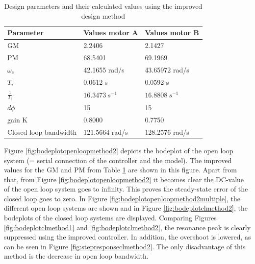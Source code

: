 \documentclass[a4paper,kul]{kulakarticle} %
\begin{document}
\begin{table}[htp!]
	
	\centering
	
	\begin{tabular}{|l|l|l|}
		\hline
		Parameter                & Values motor A & Values motor B                       \\ \hline
		GM                       & 2.2406 &        2.1427                \\
		PM                       & 68.5401\degree & 69.1969\degree \\
		$\omega_c$ & 42.1655 rad/s              &  43.65972 rad/s\\
		$T_i $                    & 0.0612 s    &     0.0592 s           \\
		$\frac{1}{T_i}$                    & $\SI{16.3473}{s^{-1}} $  &  $\SI{16.8808}{s^{-1}} $                 \\
		$d\phi$             & 15\degree    & 15\degree \\
		gain K 	 		& 0.8000  & 0.7750 \\ 
		Closed loop bandwidth & 121.5664 rad/s & 128.2576 rad/s \\ \hline
	\end{tabular}
	\caption{Design parameters and their calculated values using the improved design method}
	\label{tab:valuesmethod2}
\end{table}
\noindent Figure \ref{fig:bodeplotopenloopmethod2} depicts the bodeplot of the open loop system (= serial connection of the controller and the model). The improved values for the GM and PM from Table \ref{tab:valuesmethod2} are shown in this figure. Apart from that, from Figure \ref{fig:bodeplotopenloopmethod2} it becomes clear the DC-value of the open loop system goes to infinity. This proves the steady-state error of the closed loop goes to zero. In Figure \ref{fig:bodeplotopenloopmethod2multiple}, the different open loop systems are shown and in Figure \ref{fig:bodeplotclmethod2}, the bodeplots of the closed loop systems are displayed. Comparing Figures \ref{fig:bodeplotclmethod1} and \ref{fig:bodeplotclmethod2}, the resonance peak is clearly suppressed using the improved controller. In addition, the overshoot is lowered, as can be seen in Figure \ref{fig:stepresponseclmethod2}. The only disadvantage of this method is the decrease in open loop bandwidth. 
\end{document}
